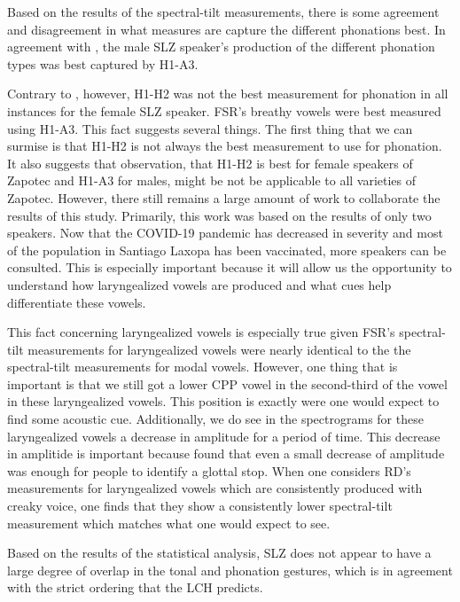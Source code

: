 \documentclass[12pt, letterpaper]{article}
\begin{document}
Based on the results of the spectral-tilt measurements, there is some agreement and disagreement in what measures are capture the different phonations best. In agreement with \citet{espositoVariationContrastivePhonation2010}, the male SLZ speaker's production of the different phonation types was best captured by H1-A3. 

Contrary to \citet{espositoVariationContrastivePhonation2010}, however, H1-H2 was not the best measurement for phonation in all instances for the female SLZ speaker. FSR's breathy vowels were best measured using H1-A3. This fact suggests several things. The first thing that we can surmise is that H1-H2 is not always the best measurement to use for phonation. It also suggests that  observation, that H1-H2 is best for female speakers of Zapotec and H1-A3 for males, might be not be applicable to all varieties of Zapotec. However, there still remains a large amount of work to collaborate the results of this study. Primarily, this work was based on the results of only two speakers. Now that the COVID-19 pandemic has decreased in severity and most of the population in Santiago Laxopa has been vaccinated, more speakers can be consulted. This is especially important because it will allow us the opportunity to understand how laryngealized vowels are produced and what cues help differentiate these vowels. 

This fact concerning laryngealized vowels is especially true given FSR's spectral-tilt measurements for laryngealized vowels were nearly identical to the the spectral-tilt measurements for modal vowels. However, one thing that is important is that we still got a lower CPP vowel in the second-third of the vowel in these laryngealized vowels. This position is exactly were one would expect to find some acoustic cue. Additionally, we do see in the spectrograms for these laryngealized vowels a decrease in amplitude for a period of time. This decrease in amplitide is important because \citet{gerfenProductionPerceptionLaryngealized2005} found that even a small decrease of amplitude was enough for people to identify a glottal stop. When one considers RD's measurements for laryngealized vowels which are consistently produced with creaky voice, one finds that they show a consistently lower spectral-tilt measurement which matches what one would expect to see.

Based on the results of the statistical analysis, SLZ does not appear to have a large degree of overlap in the tonal and phonation gestures, which is in agreement with the strict ordering that the LCH predicts. 
\end{document}

